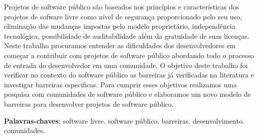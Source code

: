 \begin{resumo}
 
Projetos de software público são baseados nos princípios e características dos projetos de 
sofware livre como nível de segurança proporcionado pelo seu uso, eliminação das mudanças
impostas pelo modelo proprietário, independência tecnológica, possibilidade de
auditabilidade além da gratuidade de suas licenças.
%
Neste trabalho procuramos entender as dificuldades dos desenvolvedores em começar a 
contribuir com projetos de software público abordando todo o processo de 
entrada do desenvolvedor em uma comunidade.
%
O objetivo deste trabalho foi verificar no contexto do software público as barreiras 
já verificadas na literatura e investigar barreiras especificas. 
%
Para cumprir esses objetivos realizamos uma pesquisa com comunidades de software
público e elaboramos um novo modelo de barreiras para desenvolver projetos de 
software público.
 \vspace{\onelineskip}
    
 \noindent
 \textbf{Palavras-chaves}: software livre. software público. barreiras. desenvolvimento. comunidades.
\end{resumo}
